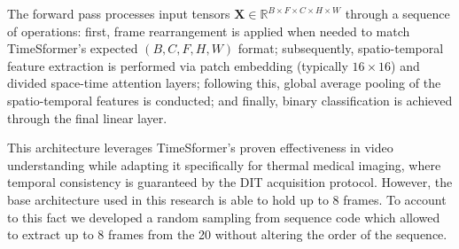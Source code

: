 \documentclass[runningheads]{llncs}
\begin{document}
The forward pass processes input tensors
$\mathbf{X} \in \mathbb{R}^{B \times F \times C \times H \times W}$
through a sequence of operations: first, frame rearrangement is
applied when needed to match TimeSformer's expected $(B,C,F,H,W)$
format; subsequently, spatio-temporal feature extraction is performed
via patch embedding (typically $16\times16$) and divided space-time
attention layers; following this, global average pooling of the
spatio-temporal features is conducted; and finally, binary
classification is achieved through the final linear layer.



This architecture leverages TimeSformer's proven effectiveness in
video understanding while adapting it specifically for thermal medical
imaging, where temporal consistency is guaranteed by the \ac{DIT}
acquisition protocol. However, the base architecture used in this
research is able to hold up to 8 frames. To account to this fact we
developed a random sampling from sequence code which allowed to
extract up to 8 frames from the 20 without altering the order of the
sequence. 
\end{document}
